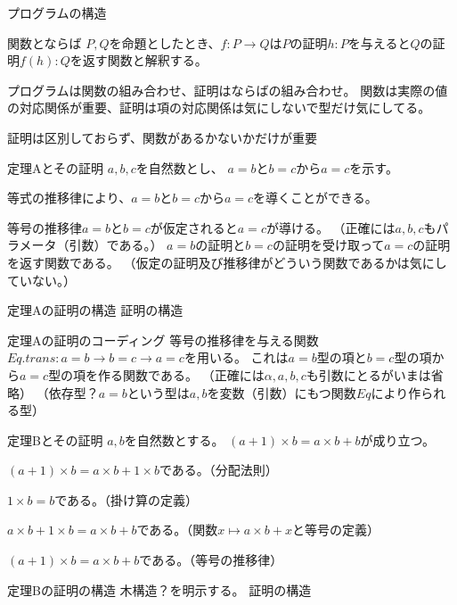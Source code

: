 \documentclass[unicode,12pt]{beamer}%
\begin{document}
\begin{frame}
  プログラムの構造
\end{frame}

\begin{frame}{関数とならば}
  $P, Q$を命題としたとき、$f : P \to Q$は$P$の証明$h:P$を与えると$Q$の証明$f(h):Q$を返す関数と解釈する。  

  プログラムは関数の組み合わせ、証明はならばの組み合わせ。
  関数は実際の値の対応関係が重要、証明は項の対応関係は気にしないで型だけ気にしてる。

  証明は区別しておらず、関数があるかないかだけが重要
\end{frame}

\begin{frame}{定理Aとその証明}
  $a, b, c$を自然数とし、
  $a=b$と$b=c$から$a=c$を示す。

  等式の推移律により、$a=b$と$b=c$から$a=c$を導くことができる。

  等号の推移律$a=b$と$b=c$が仮定されると$a=c$が導ける。
  （正確には$a, b, c$もパラメータ（引数）である。）
  $a=b$の証明と$b=c$の証明を受け取って$a=c$の証明を返す関数である。
  （仮定の証明及び推移律がどういう関数であるかは気にしていない。）
\end{frame}

\begin{frame}{定理Aの証明の構造}
  証明の構造
\end{frame}

\begin{frame}{定理Aの証明のコーディング}
  等号の推移律を与える関数$Eq.trans : a = b → b = c → a = c$を用いる。
  これは$a=b$型の項と$b=c$型の項から$a=c$型の項を作る関数である。
  （正確には$\alpha, a, b, c$も引数にとるがいまは省略）
  （依存型？$a=b$という型は$a, b$を変数（引数）にもつ関数$Eq$により作られる型）
\end{frame}

\begin{frame}{定理Bとその証明}
  $a, b$を自然数とする。
  $(a+1)\times b=a\times b+b$が成り立つ。

  $(a+1)\times b=a\times b+1\times b$である。（分配法則）

  $1\times b= b$である。（掛け算の定義）

  $a\times b+1\times b=a\times b+ b$である。（関数$x\mapsto a\times b+x$と等号の定義）

  $(a+1)\times b=a\times b+b$である。（等号の推移律）
\end{frame}

\begin{frame}{定理Bの証明の構造}
  木構造？を明示する。
  証明の構造
\end{frame}
\end{document}
